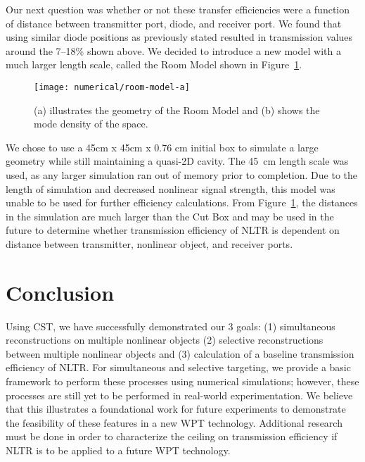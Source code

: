 Our next question was whether or not these transfer efficiencies were a function of distance between transmitter port, diode, and receiver port. We found that using similar diode positions as previously stated resulted in transmission values around the \numrange{7}{18}\% shown above. We decided to introduce a new model with a much larger length scale, called the Room Model shown in Figure~\ref{fig:numerical-room-model}.

\begin{figure}[t]
\centering
\texttt{[image: numerical/room-model-a]}
\caption[The Room Model]{(a) illustrates the geometry of the Room Model and (b)
shows the mode density of the space.}
\label{fig:numerical-room-model}
\end{figure}


We chose to use a 45cm x 45cm x 0.76 cm initial box to simulate a large geometry while still maintaining a quasi-2D cavity. The 45~cm length scale was used, as any larger simulation ran out of memory prior to completion.  Due to the length of simulation and decreased nonlinear signal strength, this model was unable to be used for further efficiency calculations. From Figure~\ref{fig:numerical-room-model}, the distances in the simulation are much larger than the Cut Box and may be used in the future to determine whether transmission efficiency of NLTR is dependent on distance between transmitter, nonlinear object, and receiver ports.

\section{Conclusion}
\label{sec:numerical-conclusion}

Using CST, we have successfully demonstrated our 3 goals: (1) simultaneous reconstructions on multiple nonlinear objects (2) selective reconstructions between multiple nonlinear objects and (3) calculation of a baseline transmission efficiency of NLTR. For simultaneous and selective targeting, we provide a basic framework to perform these processes using numerical simulations; however, these processes are still yet to be performed in real-world experimentation. We believe that this illustrates a foundational work for future experiments to demonstrate the feasibility of these features in a new WPT technology. Additional research must be done in order to characterize the ceiling on transmission efficiency if NLTR is to be applied to a future WPT technology.
